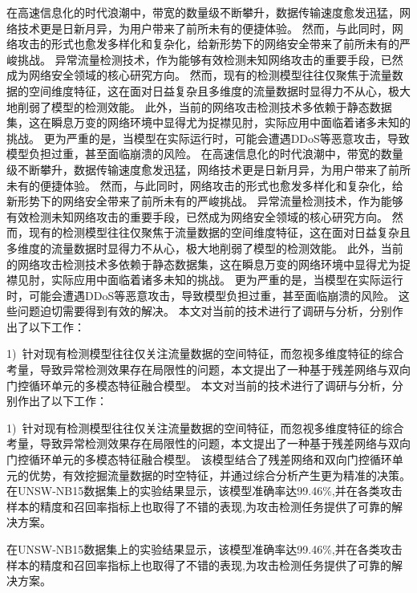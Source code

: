 \begin{cabstract}
在高速信息化的时代浪潮中，带宽的数量级不断攀升，数据传输速度愈发迅猛，网络技术更是日新月异，为用户带来了前所未有的便捷体验。
然而，与此同时，网络攻击的形式也愈发多样化和复杂化，给新形势下的网络安全带来了前所未有的严峻挑战。
异常流量检测技术，作为能够有效检测未知网络攻击的重要手段，已然成为网络安全领域的核心研究方向。
然而，现有的检测模型往往仅聚焦于流量数据的空间维度特征，这在面对日益复杂且多维度的流量数据时显得力不从心，极大地削弱了模型的检测效能。
此外，当前的网络攻击检测技术多依赖于静态数据集，这在瞬息万变的网络环境中显得尤为捉襟见肘，实际应用中面临着诸多未知的挑战。
更为严重的是，当模型在实际运行时，可能会遭遇DDoS等恶意攻击，导致模型负担过重，甚至面临崩溃的风险。
在高速信息化的时代浪潮中，带宽的数量级不断攀升，数据传输速度愈发迅猛，网络技术更是日新月异，为用户带来了前所未有的便捷体验。
然而，与此同时，网络攻击的形式也愈发多样化和复杂化，给新形势下的网络安全带来了前所未有的严峻挑战。
异常流量检测技术，作为能够有效检测未知网络攻击的重要手段，已然成为网络安全领域的核心研究方向。
然而，现有的检测模型往往仅聚焦于流量数据的空间维度特征，这在面对日益复杂且多维度的流量数据时显得力不从心，极大地削弱了模型的检测效能。
此外，当前的网络攻击检测技术多依赖于静态数据集，这在瞬息万变的网络环境中显得尤为捉襟见肘，实际应用中面临着诸多未知的挑战。
更为严重的是，当模型在实际运行时，可能会遭遇DDoS等恶意攻击，导致模型负担过重，甚至面临崩溃的风险。
这些问题迫切需要得到有效的解决。
本文对当前的技术进行了调研与分析，分别作出了以下工作：\par

1)~针对现有检测模型往往仅关注流量数据的空间特征，而忽视多维度特征的综合考量，导致异常检测效果存在局限性的问题，本文提出了一种基于残差网络与双向门控循环单元的多模态特征融合模型。
本文对当前的技术进行了调研与分析，分别作出了以下工作：\par

1)~针对现有检测模型往往仅关注流量数据的空间特征，而忽视多维度特征的综合考量，导致异常检测效果存在局限性的问题，本文提出了一种基于残差网络与双向门控循环单元的多模态特征融合模型。
该模型结合了残差网络和双向门控循环单元的优势，有效挖掘流量数据的时空特征，并通过综合分析产生更为精准的决策。
在UNSW-NB15数据集上的实验结果显示，该模型准确率达99.46\%,并在各类攻击样本的精度和召回率指标上也取得了不错的表现,为攻击检测任务提供了可靠的解决方案。\par
在UNSW-NB15数据集上的实验结果显示，该模型准确率达99.46\%,并在各类攻击样本的精度和召回率指标上也取得了不错的表现,为攻击检测任务提供了可靠的解决方案。\par


\end{cabstract}
